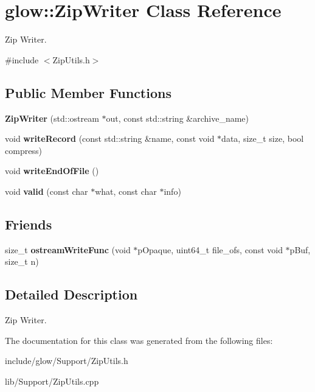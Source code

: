 \hypertarget{classglow_1_1_zip_writer}{}\section{glow\+:\+:Zip\+Writer Class Reference}
\label{classglow_1_1_zip_writer}


Zip Writer.  




{\ttfamily \#include $<$Zip\+Utils.\+h$>$}

\subsection*{Public Member Functions}
\begin{DoxyCompactItemize}
\item 
\mbox{\label{classglow_1_1_zip_writer_a823613141dcb5b2d024a8e4e64282914}} 
{\bfseries Zip\+Writer} (std\+::ostream $\ast$out, const std\+::string \&archive\+\_\+name)
\item 
\mbox{\label{classglow_1_1_zip_writer_a9fa741779d1e97aa753e14f82449b3b6}} 
void {\bfseries write\+Record} (const std\+::string \&name, const void $\ast$data, size\+\_\+t size, bool compress)
\item 
\mbox{\label{classglow_1_1_zip_writer_af7d53e0867611de0ddc9d502a0a19012}} 
void {\bfseries write\+End\+Of\+File} ()
\item 
\mbox{\label{classglow_1_1_zip_writer_a30a6977c2387fb1c86c3a771bcba7768}} 
void {\bfseries valid} (const char $\ast$what, const char $\ast$info)
\end{DoxyCompactItemize}
\subsection*{Friends}
\begin{DoxyCompactItemize}
\item 
\mbox{\label{classglow_1_1_zip_writer_a178eae10d142fcd9777c5f215520980a}} 
size\+\_\+t {\bfseries ostream\+Write\+Func} (void $\ast$p\+Opaque, uint64\+\_\+t file\+\_\+ofs, const void $\ast$p\+Buf, size\+\_\+t n)
\end{DoxyCompactItemize}


\subsection{Detailed Description}
Zip Writer. 

The documentation for this class was generated from the following files\+:\begin{DoxyCompactItemize}
\item 
include/glow/\+Support/Zip\+Utils.\+h\item 
lib/\+Support/Zip\+Utils.\+cpp\end{DoxyCompactItemize}
